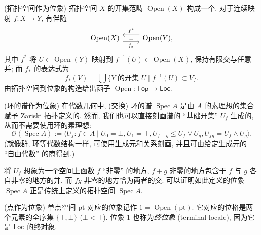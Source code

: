 \begin{example}
	{(拓扑空间作为位象)}
	拓扑空间 $X$ 的开集范畴 $\operatorname{Open}(X)$ 构成一个\fm{}.
	对于连续映射 $f \colon X \to Y$,
	有伴随
	\[\begin{tikzcd}[ampersand replacement=\&]
		{\operatorname{Open}(X)} \& {\operatorname{Open}(Y),}
		\arrow[""{name=0, anchor=center, inner sep=0}, "{f^*}"', shift right=2, from=1-2, to=1-1]
		\arrow[""{name=1, anchor=center, inner sep=0}, "{f_*}"', shift right=2, from=1-1, to=1-2]
		\arrow["\dashv"{anchor=center, rotate=-90}, draw=none, from=0, to=1]
	\end{tikzcd}\]
	其中 $f^*$ 将 $U\in\operatorname{Open}(Y)$ 映射到 $f^{-1}(U)\in\operatorname{Open}(X)$, 保持有限交与任意并; 而 $f_*$ 的表达式为
	\[
	f_*(V) = \bigcup \{\text{$Y$ 的开集 $U$} \mid f^{-1}(U)\subset V\}.
	\]
	由拓扑空间到位象的构造给出函子 $\operatorname{Open} \colon \mathsf {Top} \to \mathsf {Loc}.$
\end{example}

\begin{example}
	[label={spectrum-as-locale}]
	{(环的谱作为位象)}
	在代数几何中, (交换) 环的谱 $\operatorname{Spec}A$ 是由 $A$ 的素理想的集合赋予 Zariski 拓扑定义的. 然而, 我们也可以直接刻画谱的 ``基础开集'' $U_f$ 生成的\fm, 从而不需要使用环的素理想\footnotemark:
	$$
	\mathcal O(\operatorname{Spec}A):= \big\langle U_f\colon f\in A\mid U_0 = \bot, U_1 = \top,
	U_{f+g} \leq U_f \vee U_g, U_{fg} = U_f \wedge U_g \big\rangle.
	$$
	(\fm{}就像群, 环等代数结构一样, 可使用生成元和关系刻画, 并且可由给定生成元的 ``自由代数'' 的商得到.)
	
	将 $U_f$ 想象为一个空间上函数 $f$ ``非零'' 的地方,
	$f+g$ 非零的地方包含于 $f$ 与 $g$ 各自非零的地方的并,
	而 $fg$ 非零的地方恰为两者的交.
	可以证明如此定义的位象 $\operatorname{Spec}A$ 正是传统上定义的拓扑空间 $\operatorname{Spec}A$.
\end{example}


\begin{example}
	{(点作为位象)}
	单点空间 $\text{pt}$ 对应的位象记作 $1 = \operatorname{Open}(\text{pt})$.
	它对应的位格是两个元素的全序集 $\{\top,\bot\}$ ($\bot < \top$).
	位象 $1$ 也称为\emph{终位象} (terminal locale), 因为它是 $\mathsf {Loc}$ 的终对象.
\end{example}

